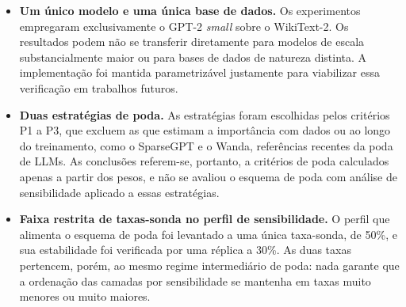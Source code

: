 \begin{itemize}
    \item \textbf{Um único modelo e uma única base de dados.} Os experimentos empregaram
          exclusivamente o GPT-2 \textit{small} sobre o WikiText-2. Os resultados podem
          não se transferir diretamente para modelos de escala substancialmente maior ou
          para bases de dados de natureza distinta. A implementação foi mantida parametrizável
          justamente para viabilizar essa verificação em trabalhos futuros.

    \item \textbf{Duas estratégias de poda.} As estratégias foram escolhidas pelos
          critérios P1 a P3, que excluem as que
          estimam a importância com dados ou ao longo do treinamento, como o SparseGPT e o
          Wanda, referências recentes da poda de LLMs. As conclusões referem-se, portanto,
          a critérios de poda calculados apenas a partir dos pesos, e não se avaliou
          o esquema de poda com análise de sensibilidade aplicado a essas estratégias.

    \item \textbf{Faixa restrita de taxas-sonda no perfil de sensibilidade.} O perfil que
          alimenta o esquema de poda foi levantado a uma única taxa-sonda, de 50\%, e sua
          estabilidade foi verificada por uma réplica a 30\%.
          As duas taxas pertencem, porém, ao mesmo
          regime intermediário de poda: nada garante que a ordenação das camadas por
          sensibilidade se mantenha em taxas muito menores ou muito maiores.


\end{itemize}
